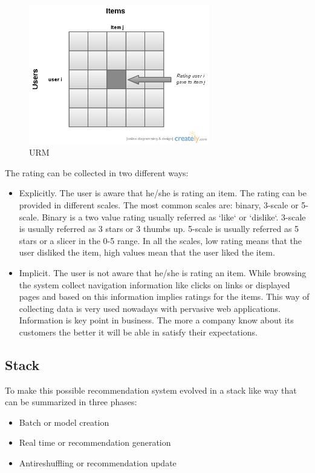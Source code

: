 \begin{itemize}
  \begin{figure}
    \centering
    \includegraphics[width=0.7\textwidth]{figures/URM.png}
    \caption{URM}
    \label{fig:URM}
  \end{figure}

The rating can be collected in two different ways:
\begin{itemize}
\item Explicitly. The user is aware that he/she is rating an item. The rating can be provided in different scales. The most common scales are: binary, 3-scale or 5-scale. Binary is a two value rating usually referred as `like` or `dislike`. 3-scale is usually referred as 3 stars or 3 thumbs up. 5-scale is usually referred as 5 stars or a slicer in the 0-5 range. In all the scales, low rating means that the user disliked the item, high values mean that the user liked the item.
\item Implicit. The user is not aware that he/she is rating an item. While browsing the system collect navigation information like clicks on links or displayed pages and based on this information implies ratings for the items. This way of collecting data is very used nowadays with pervasive web applications. Information is key point in business. The more a company know about its customers the better it will be able in satisfy their expectations. 
\end{itemize}
\end{itemize}

\subsection{Stack}
\label{sec:Stack}

 To make this possible recommendation system evolved in a stack like way that can be summarized in three phases:
\begin{itemize}
\item Batch or model creation
\item Real time or recommendation generation
\item Antireshuffling or recommendation update 
\end{itemize}
